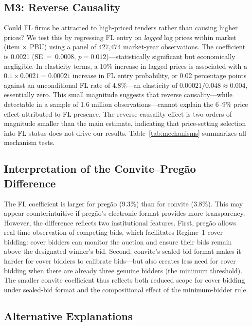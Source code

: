 \subsection{M3: Reverse Causality}

Could FL firms be attracted to high-priced tenders rather than causing
higher prices? We test this by regressing FL entry on \emph{lagged} log
prices within market (item $\times$ PBU) using a panel of 427,474
market-year observations. The coefficient is 0.0021 (SE~=~0.0008,
$p = 0.012$)---statistically significant but economically negligible.
In elasticity terms, a 10\% increase in lagged prices is associated with
a $0.1 \times 0.0021 = 0.00021$ increase in FL entry probability, or
0.02 percentage points against an unconditional FL rate of 4.8\%---an
elasticity of $0.00021 / 0.048 \approx 0.004$, essentially zero. This
small magnitude suggests that reverse causality---while detectable in a
sample of 1.6 million observations---cannot explain the 6--9\% price
effect attributed to FL presence. The reverse-causality effect is two
orders of magnitude smaller than the main estimate, indicating that
price-setting selection into FL status does not drive our results.
Table~\ref{tab:mechanisms} summarizes all mechanism tests.



\subsection{Interpretation of the Convite--Preg\~ao Difference}

The FL coefficient is larger for preg\~ao (9.3\%) than for convite
(3.8\%). This may appear counterintuitive if preg\~ao's electronic
format provides more transparency. However, the difference reflects
two institutional features. First, preg\~ao allows real-time observation
of competing bids, which facilitates Regime~1 cover bidding: cover
bidders can monitor the auction and ensure their bids remain above the
designated winner's bid. Second, convite's sealed-bid format makes it
harder for cover bidders to calibrate bids---but also creates less need
for cover bidding when there are already three genuine bidders (the
minimum threshold). The smaller convite coefficient thus reflects both
reduced scope for cover bidding under sealed-bid format and the
compositional effect of the minimum-bidder rule.

\subsection{Alternative Explanations} %

